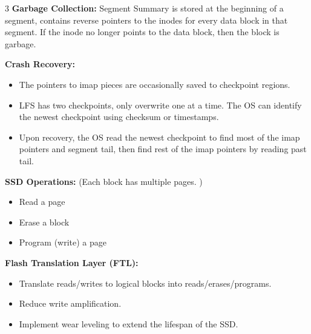 \documentclass[8pt]{innovativeinnovation-cheatsheet}
\begin{document}
\begin{multicols*}{3}
\textbf{Garbage Collection:} Segment Summary is stored at the beginning of a segment, contains reverse pointers to the inodes for every data block in that segment. If the inode no longer points to the data block, then the block is garbage.

\textbf{Crash Recovery:}
\begin{itemize}
      \item The pointers to imap pieces are occasionally saved to checkpoint regions.
      \item LFS has two checkpoints, only overwrite one at a time. The OS can identify the newest checkpoint using checksum or timestamps.
      \item Upon recovery, the OS read the newest checkpoint to find most of the imap pointers and segment tail, then find rest of the imap pointers by reading past tail.
\end{itemize}

\newpage
{}

\textbf{SSD Operations:} (Each block has multiple pages. )
\begin{itemize}
      \item Read a page
      \item Erase a block
      \item Program (write) a page
\end{itemize}

\textbf{Flash Translation Layer (FTL):}
\begin{itemize}
      \item Translate reads/writes to logical blocks into reads/erases/programs.
      \item Reduce write amplification.
      \item Implement wear leveling to extend the lifespan of the SSD.
\end{itemize}



\end{multicols*}
\end{document}
